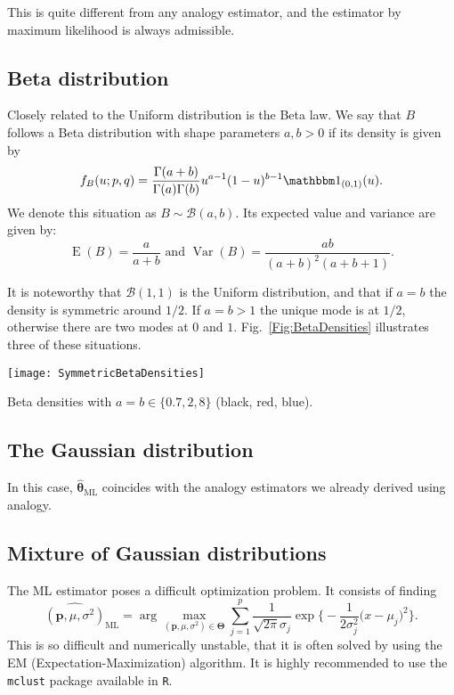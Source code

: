 This is quite different from any analogy estimator, and the estimator by maximum likelihood is always admissible.

\subsection{Beta distribution}\label{Sec:BetaDistribution}

Closely related to the Uniform distribution is the Beta law\cite{devro86}.
We say that $B$ follows a Beta distribution with shape parameters $a,b>0$ if its density is given by
\begin{equation}
f_B(u;p,q) = \frac{\Gamma(a+b)}{\Gamma(a)\Gamma(b)} u^{a-1} (1-u)^{b-1} \mathbbm 1_{(0,1)} (u).
	\label{eq:BetaDensity}
\end{equation}
We denote this situation as $B\sim\mathcal B(a,b)$.
Its expected value and variance are given by:
$$
\operatorname{E}(B) = \frac{a}{a+b} \text{ and }
\operatorname{Var}(B) = \frac{ab}{(a+b)^2(a+b+1)}.
$$

It is noteworthy that $\mathcal B(1,1)$ is the Uniform distribution, and that if $a=b$ the density is symmetric around $1/2$.
If $a=b>1$ the unique mode is at $1/2$, otherwise there are two modes at $0$ and $1$.
Fig.~\ref{Fig:BetaDensities} illustrates three of these situations.

\begin{marginfigure}
\centering
\texttt{[image: SymmetricBetaDensities]}
\caption{Beta densities with $a=b\in \{0.7,2,8 \}$ (black, red, blue).}
\label{Fig:BetaDensities}
\end{marginfigure}

\subsection{The Gaussian distribution}

In this case, $\widehat{\bm\theta}_{\text{ML}}$ coincides with the analogy estimators we already derived using analogy.

\subsection{Mixture of Gaussian distributions}

The ML estimator poses a difficult optimization problem.
It consists of finding
\begin{equation}
\widehat{(\bm p,\mu,\sigma^2)}_{\text{ML}} = \arg\max_{(\bm p,\mu,\sigma^2)\in\bm{\Theta}}
\sum_{j=1}^{p}
\frac{1}{\sqrt{2\pi}\sigma_j} \exp\Big\{
-\frac{1}{2\sigma_j^2} \big(x - \mu_j)^2 \Big\}.
\end{equation}
This is so difficult and numerically unstable, that it is often solved by using the EM (Expectation-Maximization) algorithm.
It is highly recommended to use the \texttt{mclust} package\cite{mclust4} available in \texttt{R}\cite{Rmanual}.

